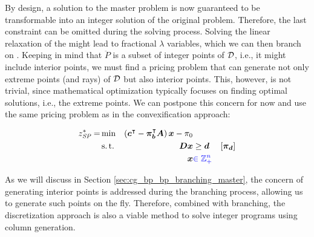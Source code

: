 By design, a solution to the master problem is now guaranteed to be transformable into an integer solution of the original problem. Therefore, the last constraint can be omitted during the solving process. Solving the linear relaxation of the \RMP{} might lead to fractional $\lambda$ variables, which we can then branch on \cite{thebook}. Keeping in mind that $\ddot{P}$ is a subset of integer points of $\mathcal{D}$, i.e., it might include interior points, we must find a pricing problem that can generate not only extreme points (and rays) of $\mathcal{D}$ but also interior points. This, however, is not trivial, since mathematical optimization typically focuses on finding optimal solutions, i.e., the extreme points. We can postpone this concern for now and use the same pricing problem as in the convexification approach:

\begin{equation}
\begin{aligned}
z^*_\SP{} = &\min & \left( \vec{c}\transpose - \vec{\pi}_\vec{b}\transpose \mat{A} \right) \vec{x} - \pi_0 & & \\
&\st & \mat{D} \vec{x} & \geq \vec{d} & \left[\vec{\pi}_\vec{d}\right] \\
&& \vec{x} & {\color{blue} \in \mathbb{Z}_+^n}
\end{aligned}
\end{equation}

As we will discuss in Section \ref{sec:cg_bp_bp_branching_master}, the concern of generating interior points is addressed during the branching process, allowing us to generate such points on the fly. Therefore, combined with branching, the discretization approach is also a viable method to solve integer programs using column generation.
